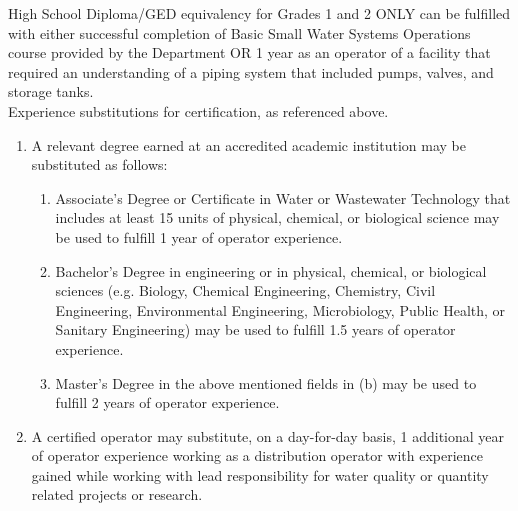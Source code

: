 \begin{tiny}

High School Diploma/GED equivalency for Grades 1 and 2 ONLY can be fulfilled with either successful completion of Basic Small Water Systems Operations course provided by the Department OR 1 year as an operator of a facility that required an understanding of a piping system that included pumps, valves, and storage tanks.\\

Experience substitutions for certification, as referenced above.
\begin{enumerate}[]
\item A relevant degree earned at an accredited academic institution may be substituted as follows:
\begin{enumerate}[label=(\alph*)]
\item Associate’s Degree or Certificate in Water or Wastewater Technology that includes at least 15 units of physical, chemical, or biological science may be used to fulfill 1 year of operator experience.
\item Bachelor’s Degree in engineering or in physical, chemical, or biological sciences (e.g. Biology, Chemical Engineering, Chemistry, Civil Engineering, Environmental Engineering, Microbiology, Public Health, or Sanitary Engineering) may be used to fulfill 1.5 years of operator experience.
\item Master’s Degree in the above mentioned fields in (b) may be used to fulfill 2 years of operator experience.
\end{enumerate}
\item A certified operator may substitute, on a day-for-day basis, 1 additional year of operator experience working as a distribution operator with experience gained while working with lead responsibility for water quality or quantity related projects or research.
\end{enumerate}	
\end{tiny}

\newpage
